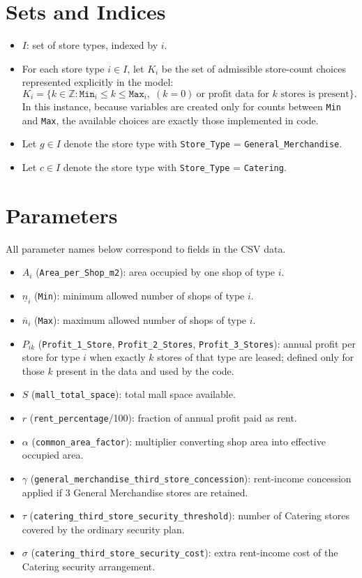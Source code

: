 \section*{Sets and Indices}

\begin{itemize}
    \item $I$: set of store types, indexed by $i$.
    \item For each store type $i \in I$, let $K_i$ be the set of admissible store-count choices represented explicitly in the model:
    \[
    K_i=\{k \in \mathbb{Z}: \texttt{Min}_i \le k \le \texttt{Max}_i,\; (k=0)\ \text{or profit data for }k\text{ stores is present}\}.
    \]
    In this instance, because variables are created only for counts between \texttt{Min} and \texttt{Max}, the available choices are exactly those implemented in code.
    \item Let $g \in I$ denote the store type with \texttt{Store\_Type} = \texttt{General\_Merchandise}.
    \item Let $c \in I$ denote the store type with \texttt{Store\_Type} = \texttt{Catering}.
\end{itemize}

\section*{Parameters}

All parameter names below correspond to fields in the CSV data.

\begin{itemize}
    \item $A_i$ (\texttt{Area\_per\_Shop\_m2}): area occupied by one shop of type $i$.
    \item $\underline{n}_i$ (\texttt{Min}): minimum allowed number of shops of type $i$.
    \item $\overline{n}_i$ (\texttt{Max}): maximum allowed number of shops of type $i$.
    \item $P_{ik}$ (\texttt{Profit\_1\_Store}, \texttt{Profit\_2\_Stores}, \texttt{Profit\_3\_Stores}): annual profit per store for type $i$ when exactly $k$ stores of that type are leased; defined only for those $k$ present in the data and used by the code.
    \item $S$ (\texttt{mall\_total\_space}): total mall space available.
    \item $r$ (\texttt{rent\_percentage}/100): fraction of annual profit paid as rent.
    \item $\alpha$ (\texttt{common\_area\_factor}): multiplier converting shop area into effective occupied area.
    \item $\gamma$ (\texttt{general\_merchandise\_third\_store\_concession}): rent-income concession applied if 3 General Merchandise stores are retained.
    \item $\tau$ (\texttt{catering\_third\_store\_security\_threshold}): number of Catering stores covered by the ordinary security plan.
    \item $\sigma$ (\texttt{catering\_third\_store\_security\_cost}): extra rent-income cost of the Catering security arrangement.
\end{itemize}

